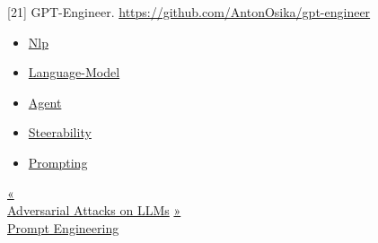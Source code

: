 {[}21{]} GPT-Engineer. \url{https://github.com/AntonOsika/gpt-engineer}

\begin{itemize}
\tightlist
\item
  \href{https://lilianweng.github.io/tags/nlp/}{Nlp}
\item
  \href{https://lilianweng.github.io/tags/language-model/}{Language-Model}
\item
  \href{https://lilianweng.github.io/tags/agent/}{Agent}
\item
  \href{https://lilianweng.github.io/tags/steerability/}{Steerability}
\item
  \href{https://lilianweng.github.io/tags/prompting/}{Prompting}
\end{itemize}

\href{https://lilianweng.github.io/posts/2023-10-25-adv-attack-llm/}{{« }\\
{Adversarial Attacks on LLMs}} \href{https://lilianweng.github.io/posts/2023-03-15-prompt-engineering/}{{ »}\\
{Prompt Engineering}}

